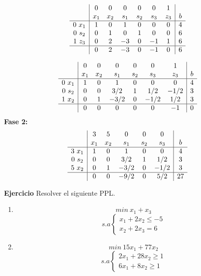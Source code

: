 \documentclass[11pt,fleqn]{book} %
\begin{document}
$$
\begin{array}{c|cccccc|c}
  & 0 & 0 & 0 & 0 & 0 & 1 & \\
  & x_1 & x_2 & s_1 & s_2 & s_3 & z_3 & b \\ \hline
  0 ~ x_1 & 1 & 0 & 1 & 0 & 0 & 0 & 4 \\
  0 ~ s_2 & 0 & 1 & 0 & 1 & 0 & 0 & 6 \\
  1 ~ z_3 & 0 & 2 & -3 & 0 & -1 & 1 & 6 \\ \hline
  & 0 & 2 & -3 & 0 & -1 & 0 & 6
\end{array}
$$

$$
\begin{array}{c|cccccc|c}
  & 0 & 0 & 0 & 0 & 0 & 1 & \\
  & x_1 & x_2 & s_1 & s_2 & s_3 & z_3 & b \\ \hline
  0 ~ x_1 & 1 & 0 & 1 & 0 & 0 & 0 & 4 \\
  0 ~ s_2 & 0 & 0 & 3/2 & 1 & 1/2 & -1/2 & 3 \\
  1 ~ x_2 & 0 & 1 & -3/2 & 0 & -1/2 & 1/2 & 3 \\ \hline
  & 0 & 0 & 0 & 0 & 0 & -1 & 0 
\end{array}
$$
\textbf{Fase 2: }
$$
\begin{array}{c|ccccc|c}
  & 3 & 5 & 0 & 0 & 0 & \\
  & x_1 & x_2 & s_1 & s_2 & s_3 & b \\ \hline
  3 ~ x_1 & 1 & 0 & 1 & 0 & 0 & 4 \\
  0 ~ s_2 & 0 & 0 & 3/2 & 1 & 1/2 & 3 \\
  5 ~ x_2 & 0 & 1 & -3/2 & 0 & -1/2 & 3 \\ \hline
  & 0 & 0 & -9/2 & 0  & 5/2 & 27 
\end{array}
$$

\textbf{Ejercicio} Resolver el siguiente PPL.

\begin{enumerate}
\item 
  $$min ~x_1 + x_3 $$
  $$s.a \left\{
  \begin{array}{c}
	x_1+2x_2 \leq -5 \\
	x_2 + 2x_3 = 6 
  \end{array}
  \right.
  $$
\item $$min ~ 15 x_1 + 77 x_2 $$
  $$s.a \left\{
  \begin{array}{c}
	2x_1+28x_2 \geq 1 \\
	6x_1+8x_2 \geq 1
  \end{array}
  \right.
  $$
\end{enumerate}
\end{document}
